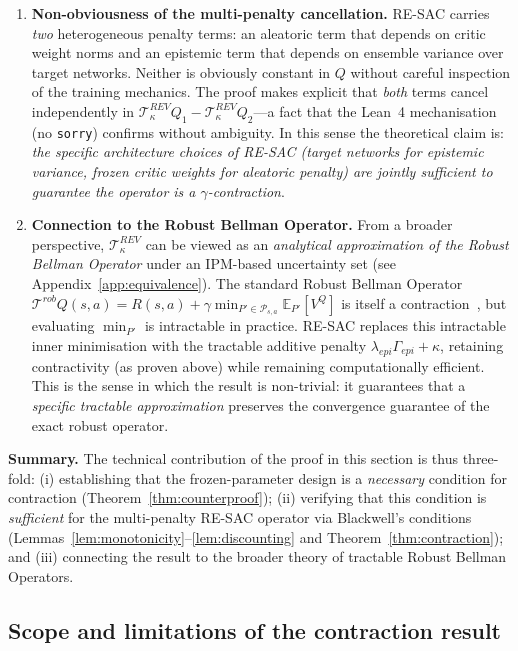 \begin{enumerate}
    \item \textbf{Non-obviousness of the multi-penalty cancellation.}
    RE-SAC carries \emph{two} heterogeneous penalty terms: an aleatoric term that depends on critic weight norms and an epistemic term that depends on ensemble variance over target networks. Neither is obviously constant in $Q$ without careful inspection of the training mechanics. The proof makes explicit that \emph{both} terms cancel independently in $\mathcal{T}^{REV}_\kappa Q_1 - \mathcal{T}^{REV}_\kappa Q_2$---a fact that the Lean~4 mechanisation (no \texttt{sorry}) confirms without ambiguity. In this sense the theoretical claim is: \emph{the specific architecture choices of RE-SAC (target networks for epistemic variance, frozen critic weights for aleatoric penalty) are jointly sufficient to guarantee the operator is a $\gamma$-contraction}.

    \item \textbf{Connection to the Robust Bellman Operator.}
    From a broader perspective, $\mathcal{T}^{REV}_\kappa$ can be viewed as an \emph{analytical approximation of the Robust Bellman Operator} under an IPM-based uncertainty set (see Appendix~\ref{app:equivalence}). The standard Robust Bellman Operator $\mathcal{T}^{rob}Q(s,a)=R(s,a)+\gamma\min_{P'\in\mathcal{P}_{s,a}}\mathbb{E}_{P'}[V^Q]$ is itself a contraction~\cite{Iyengar2005RobustDP}, but evaluating $\min_{P'}$ is intractable in practice. RE-SAC replaces this intractable inner minimisation with the tractable additive penalty $\lambda_{epi}\Gamma_{epi}+\kappa$, retaining contractivity (as proven above) while remaining computationally efficient. This is the sense in which the result is non-trivial: it guarantees that a \emph{specific tractable approximation} preserves the convergence guarantee of the exact robust operator.
\end{enumerate}

\textbf{Summary.}
The technical contribution of the proof in this section is thus three-fold: (i) establishing that the frozen-parameter design is a \emph{necessary} condition for contraction (Theorem~\ref{thm:counterproof}); (ii) verifying that this condition is \emph{sufficient} for the multi-penalty RE-SAC operator via Blackwell's conditions (Lemmas~\ref{lem:monotonicity}--\ref{lem:discounting} and Theorem~\ref{thm:contraction}); and (iii) connecting the result to the broader theory of tractable Robust Bellman Operators.

\subsection{Scope and limitations of the contraction result}
\label{app:scope}

